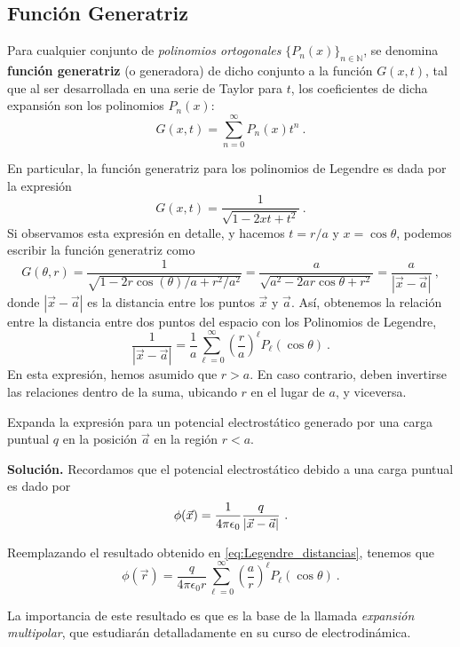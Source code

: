 \subsection{Función Generatriz}

\begin{defi}
    Para cualquier conjunto de \emph{polinomios ortogonales} $\{P_n(x)\}_{n\in \mathbb{N}}$, se denomina \textbf{función generatriz} (o generadora) de dicho conjunto a la función $G(x,t)$, tal que al ser desarrollada en una serie de Taylor para $t$, los coeficientes de dicha expansión son los polinomios $P_n(x)$:
\begin{equation}
    G(x,t) = \sum_{n=0}^{\infty} P_n(x)t^n \ .
\end{equation}
\end{defi}

En particular, la función generatriz para los polinomios de Legendre es dada por la expresión
\begin{equation}
    G(x,t) = \frac{1}{\sqrt{1-2xt + t^2}} \ .
\end{equation}
Si observamos esta expresión en detalle, y hacemos $t=r/a$ y $x = \cos\theta$, podemos escribir la función generatriz como
\begin{equation}
    G(\theta, r) = \frac{1}{\sqrt{1-2r \cos(\theta)/a + r^2/a^2}} = \frac{a}{\sqrt{a^2-2ar\cos\theta + r^2}} = \frac{a}{|\vec{x}-\vec{a}|} \ , 
\end{equation} 
donde $|\vec{x}-\vec{a}|$ es la distancia entre los puntos $\vec{x}$ y $\vec{a}$. Así, obtenemos la relación entre la distancia entre dos puntos del espacio con los Polinomios de Legendre,
\begin{equation} \label{eq:Legendre_distancias}
    \frac{1}{|\vec{x} - \vec{a}|} = \frac{1}{a}\sum_{\ell=0}^\infty \left( \frac{r}{a} \right)^\ell P_\ell(\cos\theta) \ .
\end{equation} 
En esta expresión, hemos asumido que $r>a$. En caso contrario, deben invertirse las relaciones dentro de la suma, ubicando $r$ en el lugar de $a$, y viceversa.

\begin{ejemplo}
    Expanda la expresión para un potencial electrostático generado por una carga puntual $q$ en la posición $\vec{a}$ en la región $r < a$.

    \textbf{Solución.} Recordamos que el potencial electrostático debido a una carga puntual es dado por
    \begin{equation}
        \phi(\vec{x}) = \frac{1}{4\pi \epsilon_0} \frac{q}{|\vec{x} - \vec{a}|} \ .
    \end{equation}

    Reemplazando el resultado obtenido en \eqref{eq:Legendre_distancias}, tenemos que
    \begin{equation}
        \phi(\vec{r}) = \frac{q}{4\pi \epsilon_0 r} \sum_{\ell=0}^\infty \left( \frac{a}{r} \right)^\ell P_\ell(\cos\theta) \ .
    \end{equation}

    La importancia de este resultado es que es la base de la llamada \emph{expansión multipolar}, que estudiarán detalladamente en su curso de electrodinámica.
\end{ejemplo}

